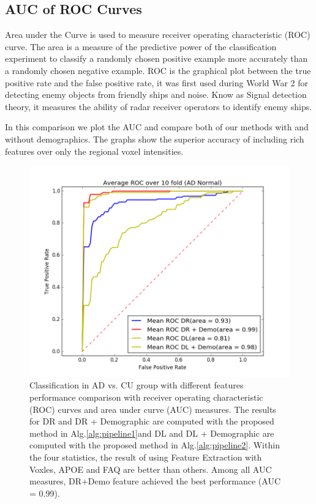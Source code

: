 \subsection{AUC of ROC Curves}
Area under the Curve is used to measure receiver operating characteristic (ROC) curve. The area is a measure of the predictive power of the classification experiment to classify a  randomly chosen positive example more accurately than a randomly chosen negative example. ROC is the graphical plot between the true positive rate and the false positive rate, it was first used during World War 2 for detecting enemy objects from friendly ships and noise. Know as Signal detection theory, it measures the ability of radar receiver operators to identify enemy ships. 

In this comparison we plot the AUC and compare both of our methods with and without demographics. The graphs show the superior accuracy of including rich features over only the regional voxel intensities. 
\begin{figure}[h]
	\centering
	\includegraphics[width=\linewidth]{figures/AD_CU}
	\caption[ROC for AD vs. CU]{Classification in AD vs. CU group with different features performance comparison with receiver operating characteristic (ROC) curves and area under curve (AUC) measures. The results for DR and DR + Demographic are computed with the proposed method in Alg.\ref{alg:pipeline1}and DL and DL + Demographic are computed with the proposed method in Alg.\ref{alg:pipeline2}. Within the four statistics, the result of using Feature Extraction with Voxles, APOE and FAQ are better than others. Among all AUC measures, DR+Demo feature achieved the best performance (AUC = 0.99).}
	\label{fig:adcu}
\end{figure}
